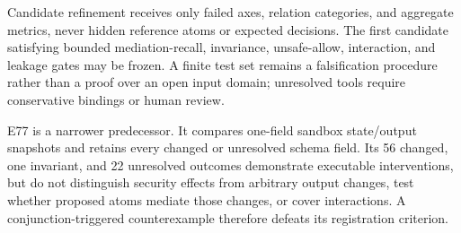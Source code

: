 Candidate refinement receives only failed axes, relation categories, and aggregate metrics, never hidden reference atoms or expected decisions. The first candidate satisfying bounded mediation-recall, invariance, unsafe-allow, interaction, and leakage gates may be frozen. A finite test set remains a falsification procedure rather than a proof over an open input domain; unresolved tools require conservative bindings or human review.

E77 is a narrower predecessor. It compares one-field sandbox state/output snapshots and retains every changed or unresolved schema field. Its 56 changed, one invariant, and 22 unresolved outcomes demonstrate executable interventions, but do not distinguish security effects from arbitrary output changes, test whether proposed atoms mediate those changes, or cover interactions. A conjunction-triggered counterexample therefore defeats its registration criterion.
